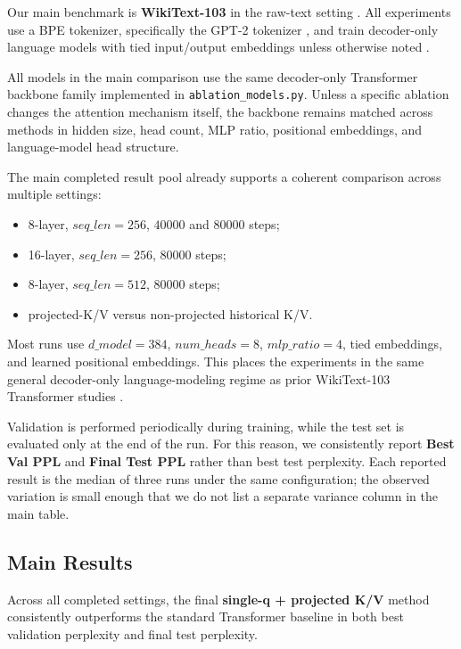 \documentclass[11pt]{article}
\begin{document}
Our main benchmark is \textbf{WikiText-103} in the raw-text setting \cite{merity2016wikitext}. All experiments use a BPE tokenizer, specifically the GPT-2 tokenizer \cite{radford2019gpt2}, and train decoder-only language models with tied input/output embeddings unless otherwise noted \cite{press2017tie}.

All models in the main comparison use the same decoder-only Transformer backbone family implemented in \texttt{ablation\_models.py}. Unless a specific ablation changes the attention mechanism itself, the backbone remains matched across methods in hidden size, head count, MLP ratio, positional embeddings, and language-model head structure.

The main completed result pool already supports a coherent comparison across multiple settings:
\begin{itemize}[leftmargin=1.5em]
    \item 8-layer, $seq\_len=256$, $40000$ and $80000$ steps;
    \item 16-layer, $seq\_len=256$, $80000$ steps;
    \item 8-layer, $seq\_len=512$, $80000$ steps;
    \item projected-K/V versus non-projected historical K/V.
\end{itemize}
Most runs use $d\_model=384$, $num\_heads=8$, $mlp\_ratio=4$, tied embeddings, and learned positional embeddings. This places the experiments in the same general decoder-only language-modeling regime as prior WikiText-103 Transformer studies \cite{baevski2018adaptive,dai2019transformerxl}.

Validation is performed periodically during training, while the test set is evaluated only at the end of the run. For this reason, we consistently report \textbf{Best Val PPL} and \textbf{Final Test PPL} rather than best test perplexity. Each reported result is the median of three runs under the same configuration; the observed variation is small enough that we do not list a separate variance column in the main table.

\subsection{Main Results}

Across all completed settings, the final \textbf{single-q + projected K/V} method consistently outperforms the standard Transformer baseline in both best validation perplexity and final test perplexity.
\end{document}
